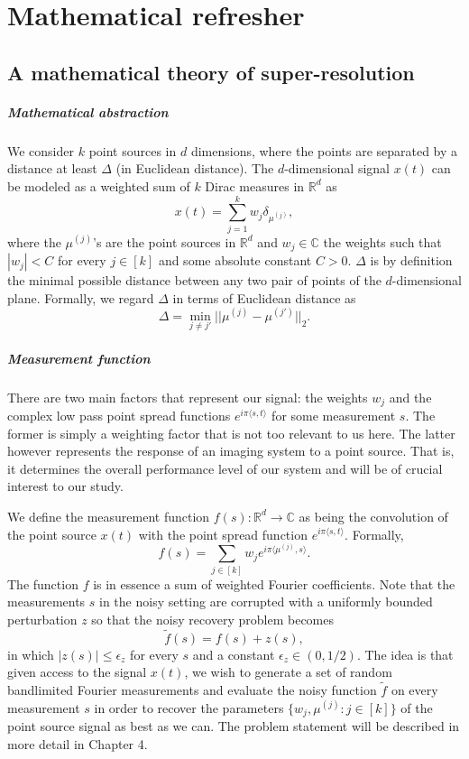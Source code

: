 \chapter{Mathematical refresher}
\section{A mathematical theory of super-resolution}
\paragraph{Mathematical abstraction} We consider $k$ point sources in $d$ dimensions, where the points are separated by a distance at least $\Delta$ (in Euclidean distance). The $d$-dimensional signal $x(t)$ can be modeled as a weighted sum of $k$ Dirac measures in $\mathbb{R}^d$ as $$x(t)=\sum_{j=1}^k w_j\delta_{\mu^{(j)}},$$ where the $\mu^{(j)}$'s are the point sources in $\mathbb{R}^d$ and $w_j\in\mathbb{C}$ the weights such that $|w_j|<C$ for every $j\in[k]$ and some absolute constant $C>0$. $\Delta$ is by definition the minimal possible distance between any two pair of points of the $d$-dimensional plane. Formally, we regard $\Delta$ in terms of Euclidean distance as $$\Delta=\min_{j\neq j'}||\mu^{(j)}-\mu^{(j')}||_2.$$
\paragraph{Measurement function} There are two main factors that represent our signal: the weights $w_j$ and the complex low pass point spread functions $e^{i\pi\langle s,t\rangle}$ for some measurement $s$. The former is simply a weighting factor that is not too relevant to us here. The latter however represents the response of an imaging system to a point source. That is, it determines the overall performance level of our system and will be of crucial interest to our study.\par 
We define the measurement function $f(s):\mathbb{R}^d\to\mathbb{C}$ as being the convolution of the point source $x(t)$ with the point spread function $e^{i\pi\langle s,t\rangle}$. Formally, $$f(s)=\sum_{j\in[k]}w_je^{i\pi\langle\mu^{(j)},s\rangle}.$$ The function $f$ is in essence a sum of weighted Fourier coefficients. Note that the measurements $s$ in the noisy setting are corrupted with a uniformly bounded perturbation $z$ so that the noisy recovery problem becomes $$\tilde{f}(s)=f(s)+z(s),$$ in which $|z(s)|\leq\epsilon_z$ for every $s$ and a constant $\epsilon_z\in(0,1/2)$. The idea is that given access to the signal $x(t)$, we wish to generate a set of random bandlimited Fourier measurements and evaluate the noisy function $\tilde{f}$ on every measurement $s$ in order to recover the parameters $\{w_j,\mu^{(j)}:j\in[k]\}$ of the point source signal as best as we can. The problem statement will be described in more detail in Chapter 4.

